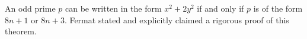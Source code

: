 An odd prime $p$ can be written in the form $x^2 + 2y^2$ if and only if $p$ is of the form $8n + 1$ or $8n + 3$. Fermat stated and explicitly claimed a rigorous proof of this theorem.
